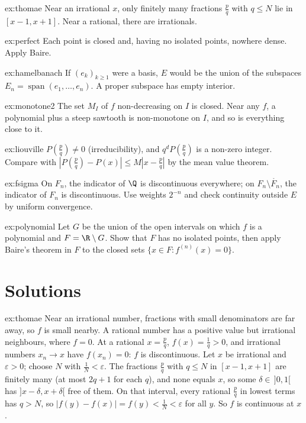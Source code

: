 \begin{hint}{ex:thomae}
Near an irrational $x$, only finitely many fractions $\frac pq$ with $q\le N$ lie in $[x-1,x+1]$. Near a rational, there are irrationals.
\end{hint}
\begin{hint}{ex:perfect}
Each point is closed and, having no isolated points, nowhere dense. Apply Baire.
\end{hint}
\begin{hint}{ex:hamelbanach}
If $(e_k)_{k\ge1}$ were a basis, $E$ would be the union of the subspaces $E_n=\operatorname{span}(e_1,\dots,e_n)$. A proper subspace has empty interior.
\end{hint}
\begin{hint}{ex:monotone2}
The set $M_I$ of $f$ non-decreasing on $I$ is closed. Near any $f$, a polynomial plus a steep sawtooth is non-monotone on $I$, and so is everything close to it.
\end{hint}
\begin{hint}{ex:liouville}
$P(\frac pq)\ne0$ (irreducibility), and $q^dP(\frac pq)$ is a non-zero integer. Compare with $|P(\frac pq)-P(x)|\le M|x-\frac pq|$ by the mean value theorem.
\end{hint}
\begin{hint}{ex:fsigma}
On $F_n$, the indicator of $\Q$ is discontinuous everywhere; on $F_n\setminus\mathring{F_n}$, the indicator of $F_n$ is discontinuous. Use weights $2^{-n}$ and check continuity outside $E$
by uniform convergence.
\end{hint}
\begin{hint}{ex:polynomial}
Let $G$ be the union of the open intervals on which $f$ is a polynomial and $F=\R\setminus G$. Show that $F$ has no isolated points, then apply Baire's theorem in $F$ to the
closed sets $\{x\in F:f^{(n)}(x)=0\}$.
\end{hint}

\section{Solutions}

\begin{solution}{ex:thomae}
\idea Near an irrational number, fractions with small denominators are far away, so $f$ is small nearby. A rational number has a positive value
but irrational neighbours, where $f=0$.
\writeup At a rational $x=\frac pq$, $f(x)=\frac1q>0$, and irrational numbers $x_n\to x$ have $f(x_n)=0$: $f$ is discontinuous. Let $x$ be irrational and $\varepsilon>0$; choose $N$ with
$\frac1N<\varepsilon$. The fractions $\frac pq$ with $q\le N$ in $[x-1,x+1]$ are finitely many (at most $2q+1$ for each $q$), and none equals $x$, so some $\delta\in\,]0,1[$ has $]x-\delta,x+\delta[$ free of
them. On that interval, every rational $\frac pq$ in lowest terms has $q>N$, so $|f(y)-f(x)|=f(y)<\frac1N<\varepsilon$ for all $y$. So $f$ is continuous at $x$.
\end{solution}

